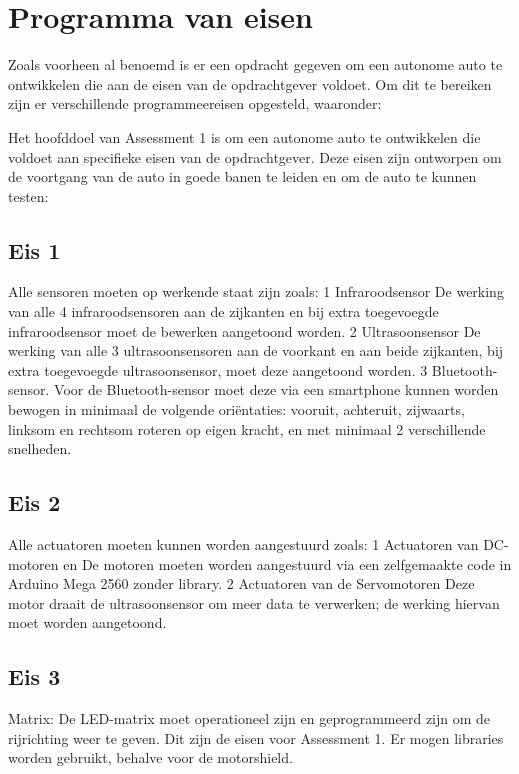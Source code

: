 \section{Programma van eisen}
Zoals voorheen al benoemd is er een opdracht gegeven om een autonome auto te ontwikkelen die aan de eisen van de opdrachtgever voldoet. Om dit te bereiken zijn er verschillende programmeereisen opgesteld, waaronder:

Het hoofddoel van Assessment 1 is om een autonome auto te ontwikkelen die voldoet aan specifieke eisen van de opdrachtgever. Deze eisen zijn ontworpen om de voortgang van de auto in goede banen te leiden en om de auto te kunnen testen:
\subsection{Eis 1} Alle sensoren moeten op werkende staat zijn zoals:
1 Infraroodsensor 
De werking van alle 4 infraroodsensoren aan de zijkanten en bij extra toegevoegde infraroodsensor moet de bewerken aangetoond worden.
2	Ultrasoonsensor 
De werking van alle 3 ultrasoonsensoren aan de voorkant en aan beide zijkanten, bij extra toegevoegde ultrasoonsensor, moet deze  aangetoond worden.
3	Bluetooth-sensor. 
Voor de Bluetooth-sensor moet deze via een smartphone kunnen worden bewogen in minimaal de volgende oriëntaties: vooruit, achteruit, zijwaarts, linksom en rechtsom roteren op eigen kracht, en met minimaal 2 verschillende snelheden.
\subsection{Eis 2} Alle actuatoren moeten kunnen worden aangestuurd zoals:
1	Actuatoren  van DC-motoren en De motoren moeten worden aangestuurd via een zelfgemaakte code in Arduino Mega 2560 zonder library.
2	Actuatoren van de Servomotoren Deze motor draait de ultrasoonsensor om meer data te verwerken; de werking hiervan moet worden aangetoond.
\subsection{Eis 3}
Matrix:
De LED-matrix moet operationeel zijn en geprogrammeerd zijn om de rijrichting weer te geven.
Dit zijn de eisen voor Assessment 1. Er mogen libraries worden gebruikt, behalve voor de motorshield. 
